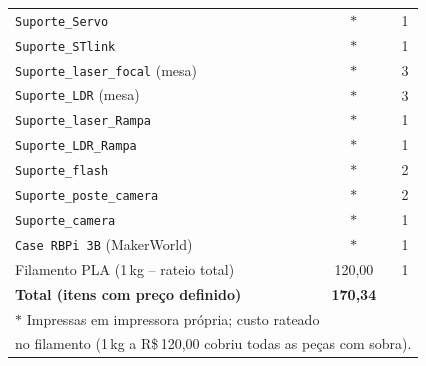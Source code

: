 \begin{table}[!htpb]
\begin{tabular}{lcc}
\texttt{Suporte\_Servo}               & $\ast$ & 1 \\
\texttt{Suporte\_STlink}              & $\ast$ & 1 \\
\texttt{Suporte\_laser\_focal} (mesa) & $\ast$ & 3 \\
\texttt{Suporte\_LDR} (mesa)          & $\ast$ & 3 \\
\texttt{Suporte\_laser\_Rampa}        & $\ast$ & 1 \\
\texttt{Suporte\_LDR\_Rampa}          & $\ast$ & 1 \\
\texttt{Suporte\_flash}               & $\ast$ & 2 \\
\texttt{Suporte\_poste\_camera}       & $\ast$ & 2 \\
\texttt{Suporte\_camera}              & $\ast$ & 1 \\
\texttt{Case RBPi 3B} (MakerWorld)    & $\ast$ & 1 \\
\hline
Filamento PLA (1\,kg -- rateio total) & 120,00 & 1 \\
\hline
\textbf{Total (itens com preço definido)} & \textbf{170,34} & \\
\hline
\multicolumn{3}{l}{%
  \footnotesize $\ast$ Impressas em impressora própria; custo rateado} \\
\multicolumn{3}{l}{%
  \footnotesize no filamento (1\,kg a R\$\,120,00 cobriu todas as peças com sobra).} \\
\hline
\end{tabular}
\end{table}










